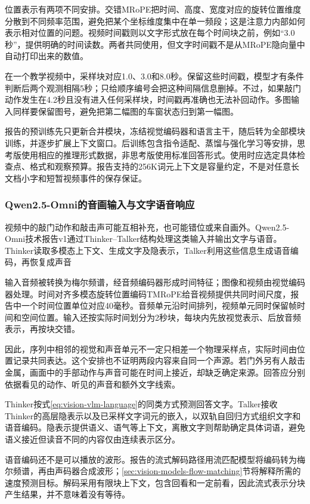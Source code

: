 位置表示有两项不同安排。交错MRoPE把时间、高度、宽度对应的旋转位置维度分散到不同频率范围，避免把某个坐标维度集中在单一频段；这是注意力内部如何表示相对位置的问题。视频时间戳则以文字形式放在每个时间块之前，例如“3.0秒”，提供明确的时间读数。两者共同使用，但文字时间戳不是从MRoPE隐向量中自动打印出来的数值。

在一个教学视频中，采样块对应1.0、3.0和8.0秒。保留这些时间戳，模型才有条件判断后两个观测相隔5秒；只给顺序编号会把这种间隔信息删掉。不过，如果敲门动作发生在4.2秒且没有进入任何采样块，时间戳再准确也无法补回动作。多图输入同样要保留图号，避免把第二幅图的车窗状态归到第一幅图。

报告的预训练先只更新合并模块，冻结视觉编码器和语言主干，随后转为全部模块训练，并逐步扩展上下文窗口。后训练包含指令适配、蒸馏与强化学习等安排，思考版使用相应的推理形式数据，非思考版使用标准回答形式。使用时应选定具体检查点、格式和观察预算。报告支持的256K词元上下文是容量约定，不是对任意长文档小字和短暂视频事件的保存保证。

\subsubsection{Qwen2.5-Omni的音画输入与文字语音响应}
\label{sec:vision-models-qwen-omni}

视频中的敲门动作和敲击声可能互相补充，也可能错位或来自画外。Qwen2.5-Omni技术报告v1通过Thinker--Talker结构处理这类输入并输出文字与语音。Thinker读取多模态上下文、生成文字及隐表示，Talker利用这些信息生成语音编码，再恢复成声音

输入音频被转换为梅尔频谱，经音频编码器形成时间特征；图像和视频由视觉编码器处理。时间对齐多模态旋转位置编码TMRoPE给音视频提供共同时间尺度，报告中一个时间位置单位对应40毫秒。音频单元沿时间排列，视频单元同时保留帧时间和空间位置。输入还按实际时间划分为2秒块，每块内先放视觉表示、后放音频表示，再按块交错。

因此，序列中相邻的视觉和声音单元不一定只相差一个物理采样点，实际时间由位置记录共同表达。这个安排也不证明两段内容来自同一个声源。若门外另有人敲击金属，画面中的手部动作与声音可能在时间上接近，却缺乏确定来源。回答应分别依据看见的动作、听见的声音和额外文字线索。

Thinker按式\eqref{eq:vision-vlm-language}的同类方式预测回答文字。Talker接收Thinker的高层隐表示以及已采样文字词元的嵌入，以双轨自回归方式组织文字和语音编码。隐表示提供语义、语气等上下文，离散文字则帮助确定具体词语，避免语义接近但读音不同的内容仅由连续表示区分。

语音编码还不是可以播放的波形。报告的流式解码路径用流匹配模型将编码转为梅尔频谱，再由声码器合成波形；\ref{sec:vision-models-flow-matching}节将解释所需的速度预测目标。解码采用有限块上下文，包含回看和一定前看，因此流式表示分块产生结果，并不意味着没有等待。

